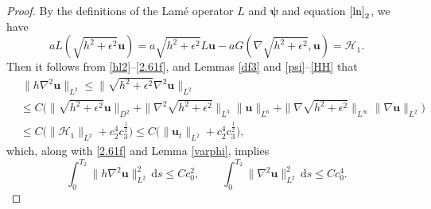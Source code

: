 \documentclass[11pt,reqno]{amsart}
\numberwithin{rk}{section}
\numberwithin{prop}{section}
\numberwithin{mydef}{section}
\numberwithin{lem}{section}
\numberwithin{equation}{section}
\numberwithin{thm}{section}
\begin{document}
\begin{proof}
By the definitions of the Lam\'e operator $L$ and $\boldsymbol{\psi}$ and equation $\eqref{ln}_2$, we have
\begin{equation}\label{2.61h}
aL(\sqrt{h^2+\epsilon^2}\boldsymbol{u}) =a\sqrt{h^2+\epsilon^2}L\boldsymbol{u}-aG(\nabla\sqrt{h^2+\epsilon^2},\boldsymbol{u})=\mathcal{H}_1.
\end{equation}
Then it follows from \eqref{hl2}--\eqref{2.61f}, and  Lemmas \ref{df3} and  \ref{psi}--\ref{HH} that 
\begin{equation}\label{2.61i}
\begin{aligned}
&\,\|h\nabla^2\boldsymbol{u}\|_{L^2} \leq\|\sqrt{h^2+\epsilon^2}\nabla^2\boldsymbol{u}\|_{L^2}\\
&\leq C\big(\|\sqrt{h^2+\epsilon^2}\boldsymbol{u}\|_{D^2} +\|\nabla^2\sqrt{h^2+\epsilon^2}\|_{L^3}\|\boldsymbol{u}\|_{L^6}+\|\nabla \sqrt{h^2+\epsilon^2}\|_{L^\infty}\|\nabla \boldsymbol{u}\|_{L^2}\big)\\
&\leq  C \big(\|\mathcal{H}_1\|_{L^2} +c_2^{4}c_3^{\frac{1}{2}}\big) \leq  C\big(\|\boldsymbol{u}_t\|_{L^2}+c_2^{4}c_3^{\frac{1}{2}}\big),
\end{aligned}
\end{equation}
which, along with \eqref{2.61f} and Lemma \ref{varphi}, implies 
\begin{equation*} 
\int_0^{T_2} \|h\nabla^2\boldsymbol{u}\|^2_{L^2}\,\mathrm{d}s
\leq  Cc^2_0,\qquad \int_0^{T_2} \|\nabla^2\boldsymbol{u}\|^2_{L^2}\,\mathrm{d}s
\leq  Cc^4_0.
\end{equation*}


\end{proof}
\end{document}
